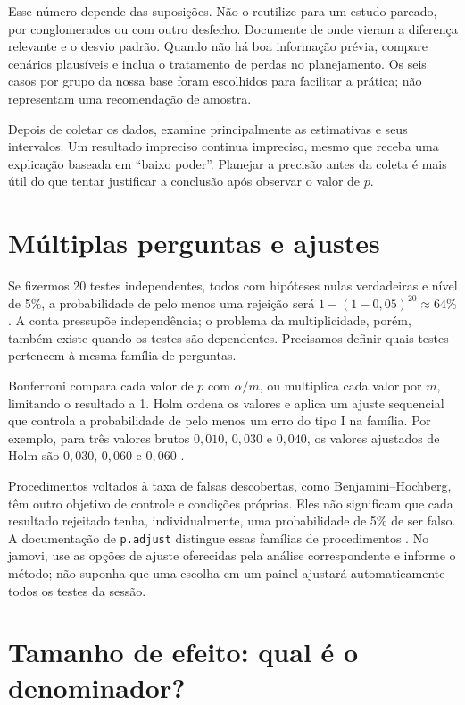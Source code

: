 Esse número depende das suposições. Não o reutilize para um estudo pareado, por conglomerados ou com outro desfecho. Documente de onde vieram a diferença relevante e o desvio padrão. Quando não há boa informação prévia, compare cenários plausíveis e inclua o tratamento de perdas no planejamento. Os seis casos por grupo da nossa base foram escolhidos para facilitar a prática; não representam uma recomendação de amostra.

Depois de coletar os dados, examine principalmente as estimativas e seus intervalos. Um resultado impreciso continua impreciso, mesmo que receba uma explicação baseada em ``baixo poder''. Planejar a precisão antes da coleta é mais útil do que tentar justificar a conclusão após observar o valor de $p$.

\section{Múltiplas perguntas e ajustes}

Se fizermos 20 testes independentes, todos com hipóteses nulas verdadeiras e nível de 5\%, a probabilidade de pelo menos uma rejeição será $1-(1-0{,}05)^{20}\approx64\%$. A conta pressupõe independência; o problema da multiplicidade, porém, também existe quando os testes são dependentes. Precisamos definir quais testes pertencem à mesma família de perguntas.

Bonferroni compara cada valor de $p$ com $\alpha/m$, ou multiplica cada valor por $m$, limitando o resultado a 1. Holm ordena os valores e aplica um ajuste sequencial que controla a probabilidade de pelo menos um erro do tipo I na família. Por exemplo, para três valores brutos $0{,}010$, $0{,}030$ e $0{,}040$, os valores ajustados de Holm são $0{,}030$, $0{,}060$ e $0{,}060$ \parencite{RAjusteP}.

Procedimentos voltados à taxa de falsas descobertas, como Benjamini--Hochberg, têm outro objetivo de controle e condições próprias. Eles não significam que cada resultado rejeitado tenha, individualmente, uma probabilidade de 5\% de ser falso. A documentação de \texttt{p.adjust} distingue essas famílias de procedimentos \parencite{RAjusteP}. No jamovi, use as opções de ajuste oferecidas pela análise correspondente e informe o método; não suponha que uma escolha em um painel ajustará automaticamente todos os testes da sessão.

\section{Tamanho de efeito: qual é o denominador?}

